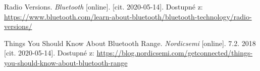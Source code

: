 \begin{thebibliography}{9}












Radio Versions.
\textit{
Bluetooth
}
[online]. [cit. 2020-05-14]. Dostupné z: 
\url{
https://www.bluetooth.com/learn-about-bluetooth/bluetooth-technology/radio-versions/
}


Things You Should Know About Bluetooth Range. \textit{ Nordicsemi } [online]. 7.2. 2018 [cit. 2020-05-14]. Dostupné z: 
\url{
https://blog.nordicsemi.com/getconnected/things-you-should-know-about-bluetooth-range
}








\end{thebibliography}
